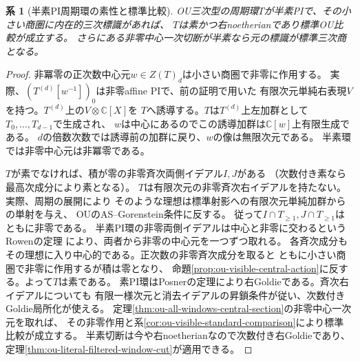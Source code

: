 \documentclass[11pt,a4paper]{ltjsarticle}
\newtheorem{corollary}[theorem]{系}
\theoremstyle{definition}
\begin{document}
\begin{corollary}[半素PI周期環の素性と標準比較]
\label{cor:ou-semiprime-pi-window-comparison}
OU三次型の周期環$T$が半素PIで、その小さい商圏に内在的三次標識があれば、
$T$は素かつ右noetherianであり標準OU比較が成立する。
さらにある非零中心一次切断が半素なら元の標識が標準三次商となる。
\end{corollary}
\begin{proof}
非冪零の正次数中心元$w\in Z(T)_d$は小さい商圏で非零に作用する。
実際、$(T^{(d)}[w^{-1}])_0$は非零affine PIで、前の証明で用いた
有限次元単純右表現$V$を持つ。$T^{(d)}$上の$V\otimes\mathbb C[X]$を
$T$へ誘導する。$T$は$T^{(d)}$上左加群として$T_0,\ldots,T_{d-1}$で生成され、
$w$は中心にあるのでこの誘導加群は$\mathbb C[w]$上有限生成である。
$d$の倍数次数では誘導前の加群に戻り、$w$の像は無限次元である。
半素環では非零中心元は非冪零である。

$T$が素でなければ、積が零の非零斉次両側イデアル$I,J$がある
（次数付き素なら最高次成分により素となる）。
$T$は有限次元の非零斉次右イデアルを持たない。実際、周期の展開により
そのような理想は標準射影への有限次元単純加群からの単射を与え、
OUのAS--Gorenstein条件\cite[(2.1)]{OU}に反する。
従って$I\cap T_{\ge1},J\cap T_{\ge1}$はともに非零である。
半素PI環の非零両側イデアルは中心と非零に交わるというRowenの定理
\cite{Rowen1973Center}により、両者から非零の中心元を一つずつ取れる。
各斉次成分もその理想に入り中心的である。正次数の非零斉次成分を取ると
ともに小さい商圏で非零に作用するが積は零となり、
命題\ref{prop:ou-visible-central-action}に反する。よって$T$は素である。
素PI環はPosnerの定理により右Goldieである。斉次右イデアルについても
有限一様次元と消去イデアルの昇鎖条件が従い、次数付きGoldie局所化が使える。
定理\ref{thm:ou-all-windows-central-section}の非零中心一次元を取れば、
その非零作用と系\ref{cor:ou-visible-standard-comparison}により標準比較が成立する。
半素切断は今や右noetherianなので次数付き右Goldieであり、
定理\ref{thm:ou-literal-filtered-window-cut}が適用できる。
\end{proof}
\end{document}
